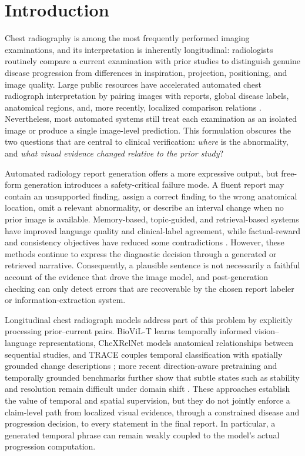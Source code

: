 \documentclass[preprint,12pt]{elsarticle}
\begin{document}
\section{Introduction}
\label{sec:introduction}

Chest radiography is among the most frequently performed imaging examinations,
and its interpretation is inherently longitudinal: radiologists routinely
compare a current examination with prior studies to distinguish genuine disease
progression from differences in inspiration, projection, positioning, and image
quality. Large public resources have accelerated automated chest radiograph
interpretation by pairing images with reports, global disease labels, anatomical
regions, and, more recently, localized comparison relations
\cite{johnson2019mimic,irvin2019chexpert,wu2021chestimagenome}. Nevertheless,
most automated systems still treat each examination as an isolated image or
produce a single image-level prediction. This formulation obscures the two
questions that are central to clinical verification: \emph{where} is the
abnormality, and \emph{what visual evidence changed relative to the prior
study}?

Automated radiology report generation offers a more expressive output, but
free-form generation introduces a safety-critical failure mode. A fluent report
may contain an unsupported finding, assign a correct finding to the wrong
anatomical location, omit a relevant abnormality, or describe an interval change
when no prior image is available. Memory-based, topic-guided, and retrieval-based
systems have improved language quality and clinical-label agreement, while
factual-reward and consistency objectives have reduced some contradictions
\cite{chen2020r2gen,nguyen2021accurate,endo2021repair,miura2021factual}.
However, these methods continue to express the diagnostic decision through a
generated or retrieved narrative. Consequently, a plausible sentence is not
necessarily a faithful account of the evidence that drove the image model, and
post-generation checking can only detect errors that are recoverable by the
chosen report labeler or information-extraction system.

Longitudinal chest radiograph models address part of this problem by explicitly
processing prior--current pairs. BioViL-T learns temporally informed
vision--language representations, CheXRelNet models anatomical relationships
between sequential studies, and TRACE couples temporal classification with
spatially grounded change descriptions
\cite{bannur2023biovilt,karwande2022chexrelnet,aranya2026trace}; more recent
direction-aware pretraining and temporally grounded benchmarks further show that
subtle states such as stability and resolution remain difficult under domain
shift \cite{hu2026protrans,prakash2026chextemporal}. These approaches establish
the value of temporal and spatial supervision, but they do not jointly enforce a
claim-level path from localized visual evidence, through a constrained disease
and progression decision, to every statement in the final report. In
particular, a generated temporal phrase can remain weakly coupled to the model's
actual progression computation.
\end{document}
